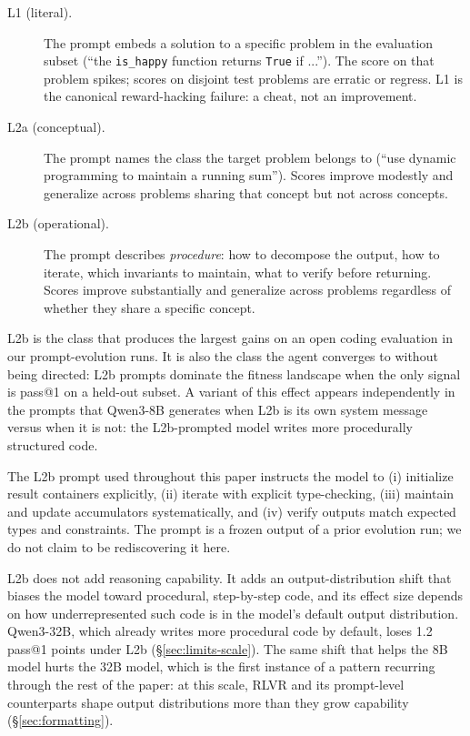 \documentclass[11pt,a4paper]{article}
\begin{document}
\begin{description}
    \item[L1 (literal).] The prompt embeds a solution to a specific problem in the evaluation subset (``the \texttt{is\_happy} function returns \texttt{True} if ...'').
    The score on that problem spikes; scores on disjoint test problems are erratic or regress.
    L1 is the canonical reward-hacking failure: a cheat, not an improvement.
    \item[L2a (conceptual).] The prompt names the class the target problem belongs to (``use dynamic programming to maintain a running sum'').
    Scores improve modestly and generalize across problems sharing that concept but not across concepts.
    \item[L2b (operational).] The prompt describes \emph{procedure}: how to decompose the output, how to iterate, which invariants to maintain, what to verify before returning.
    Scores improve substantially and generalize across problems regardless of whether they share a specific concept.
\end{description}

L2b is the class that produces the largest gains on an open coding evaluation in our prompt-evolution runs.
It is also the class the agent converges to without being directed: L2b prompts dominate the fitness landscape when the only signal is pass@1 on a held-out subset.
A variant of this effect appears independently in the prompts that Qwen3-8B generates when L2b is its own system message versus when it is not: the L2b-prompted model writes more procedurally structured code.

The L2b prompt used throughout this paper instructs the model to (i) initialize result containers explicitly, (ii) iterate with explicit type-checking, (iii) maintain and update accumulators systematically, and (iv) verify outputs match expected types and constraints.
The prompt is a frozen output of a prior evolution run; we do not claim to be rediscovering it here.

L2b does not add reasoning capability.
It adds an output-distribution shift that biases the model toward procedural, step-by-step code, and its effect size depends on how underrepresented such code is in the model's default output distribution.
Qwen3-32B, which already writes more procedural code by default, loses 1.2 pass@1 points under L2b (\S\ref{sec:limits-scale}).
The same shift that helps the 8B model hurts the 32B model, which is the first instance of a pattern recurring through the rest of the paper: at this scale, RLVR and its prompt-level counterparts shape output distributions more than they grow capability (\S\ref{sec:formatting}).
\end{document}
